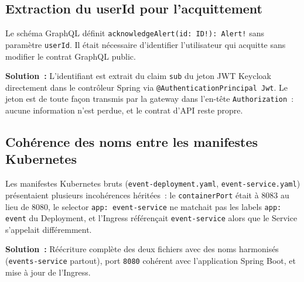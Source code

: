 \documentclass[12pt,a4paper]{article}
\begin{document}
\subsection{Extraction du userId pour l'acquittement}

Le schéma GraphQL définit \texttt{acknowledgeAlert(id: ID!): Alert!} sans
paramètre \texttt{userId}. Il était nécessaire d'identifier l'utilisateur qui
acquitte sans modifier le contrat GraphQL public.

\textbf{Solution~:} L'identifiant est extrait du claim \texttt{sub} du jeton JWT
Keycloak directement dans le contrôleur Spring via
\texttt{@AuthenticationPrincipal Jwt}. Le jeton est de toute façon transmis par
la gateway dans l'en-tête \texttt{Authorization}~: aucune information n'est perdue,
et le contrat d'API reste propre.

\subsection{Cohérence des noms entre les manifestes Kubernetes}

Les manifestes Kubernetes bruts (\texttt{event-deployment.yaml},
\texttt{event-service.yaml}) présentaient plusieurs incohérences héritées~:
le \texttt{containerPort} était à 8083 au lieu de 8080, le selector
\texttt{app: event-service} ne matchait pas les labels \texttt{app: event} du
Deployment, et l'Ingress référençait \texttt{event-service} alors que le Service
s'appelait différemment.

\textbf{Solution~:} Réécriture complète des deux fichiers avec des noms harmonisés
(\texttt{events-service} partout), port \texttt{8080} cohérent avec l'application
Spring Boot, et mise à jour de l'Ingress.
\end{document}
